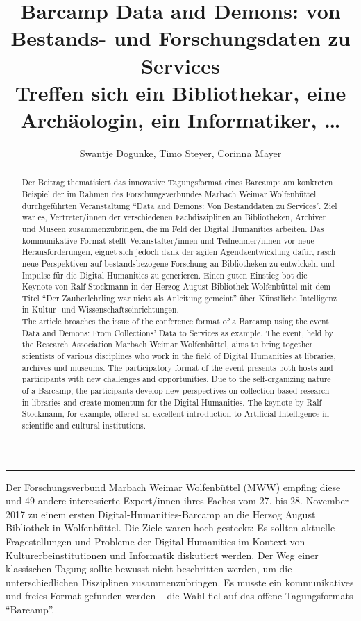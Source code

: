 \documentclass[a4paper,
fontsize=11pt,
oneside,
numbers=noperiodatend,
parskip=half-,
bibliography=totoc,
final
]{scrartcl}
\title{\LARGE{Barcamp Data and Demons: von Bestands- und Forschungsdaten zu Services \\
Treffen sich ein Bibliothekar, eine Archäologin, ein Informatiker, …}} %
\author{Swantje Dogunke, Timo Steyer, Corinna Mayer} %
\date{}
\begin{document}
\maketitle
\thispagestyle{fancyplain} 

\begin{abstract}
Der Beitrag thematisiert das innovative Tagungsformat eines Barcamps am
konkreten Beispiel der im Rahmen des Forschungsverbundes Marbach Weimar
Wolfenbüttel durchgeführten Veranstaltung \enquote{Data and Demons: Von
Bestanddaten zu Services}. Ziel war es, Vertreter/innen der
verschiedenen Fachdisziplinen an Bibliotheken, Archiven und Museen
zusammenzubringen, die im Feld der Digital Humanities arbeiten. Das
kommunikative Format stellt Veranstalter/innen und Teilnehmer/innen vor
neue Herausforderungen, eignet sich jedoch dank der agilen
Agendaentwicklung dafür, rasch neue Perspektiven auf bestandsbezogene
Forschung an Bibliotheken zu entwickeln und Impulse für die Digital
Humanities zu generieren. Einen guten Einstieg bot die Keynote von Ralf
Stockmann in der Herzog August Bibliothek Wolfenbüttel mit dem Titel
\enquote{Der Zauberlehrling war nicht als Anleitung gemeint} über Künstliche
Intelligenz in Kultur- und Wissenschaftseinrichtungen. \\

The article broaches the issue of the conference format of a Barcamp
using the event Data and Demons: From Collections' Data to Services as
example. The event, held by the Research Association Marbach Weimar
Wolfenbüttel, aims to bring together scientists of various disciplines
who work in the field of Digital Humanities at libraries, archives und
museums. The participatory format of the event presents both hosts and
participants with new challenges and opportunities. Due to the
self-organizing nature of a Barcamp, the participants develop new
perspectives on collection-based research in libraries and create
momentum for the Digital Humanities. The keynote by Ralf Stockmann, for
example, offered an excellent introduction to Artificial Intelligence in
scientific and cultural institutions.
\end{abstract}

\begin{center}\rule{0.5\linewidth}{\linethickness}\end{center}

Der Forschungsverbund Marbach Weimar Wolfenbüttel (MWW) empfing diese
und 49 andere interessierte Expert/innen ihres Faches vom 27. bis 28.
November 2017 zu einem ersten Digital-Humanities-Barcamp an die Herzog
August Bibliothek in Wolfenbüttel. Die Ziele waren hoch gesteckt: Es
sollten aktuelle Fragestellungen und Probleme der Digital Humanities im
Kontext von Kulturerbeinstitutionen und Informatik diskutiert werden.
Der Weg einer klassischen Tagung sollte bewusst nicht beschritten
werden, um die unterschiedlichen Disziplinen zusammenzubringen. Es
musste ein kommunikatives und freies Format gefunden werden -- die Wahl
fiel auf das offene Tagungsformats \enquote{Barcamp}.
\end{document}

